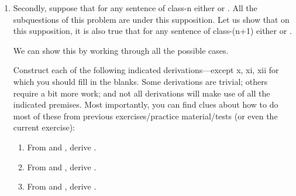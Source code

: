 \begin{enumerate}
\begin{enumerate}
  \item Secondly, suppose that for any sentence  of class-n either  
   or .  All the subquestions of this problem are under this 
   supposition.  Let us show that on this supposition, it is also true that for 
   any sentence  of class-(n+1) either  or .  


We can show this by working through all the possible cases. 


Construct each of the following indicated derivations---except x, xi, xii for 
which you should fill in the blanks. Some derivations are trivial; others 
require a bit more work; and not all derivations will make use of all the 
indicated premises.  Most importantly, you can find clues about how to do most 
of these from previous exercises/practice material/tests (or even the current 
exercise):

\begin{enumerate}

 \item From  and , derive .


\item From  and , derive .

\opts{
 \dotline

\dotline

\dotline

\dotline

\dotline

\dotline
}
{
}




\item From  and , derive .


\end{enumerate}
\end{enumerate}
\end{enumerate}
